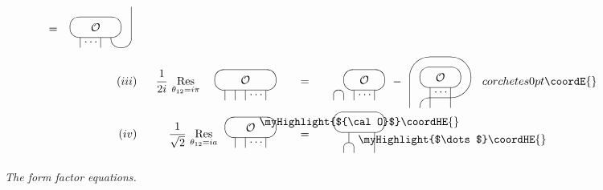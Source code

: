 \documentclass[a4paper,12pt]{article}
\def\limfunc#1{\mathop{\rm #1}}%
\begin{document}
\begin{figure}[tbh]
\[{\begin{array}{rrcl}
~=~ 
\begin{array}{c}
\unitlength3.2mm\begin{picture}(6,4) \put(5,1){\oval(2,2)[b]}
\put(2.5,2){\oval(5,2)} \put(2.5,2){\makebox(0,0){${\cal O}$}}
\put(1,0){\line(0,1){1}} \put(3,0){\line(0,1){1}} \put(6,1){\line(0,1){3}}
\put(1.4,.5){$\dots$} \end{picture}
\end{array}
\\ 
(iii) & ~~\dfrac{1}{2i}\,\limfunc{Res}\limits_{\theta _{12}=i\pi }~~ 
\begin{array}{c}
\unitlength3.2mm\begin{picture}(6,4) \put(3,2){\oval(6,2)}
\put(3,2){\makebox(0,0){${\cal O}$}} \put(1,0){\line(0,1){1}}
\put(2,0){\line(0,1){1}} \put(3,0){\line(0,1){1}} \put(5,0){\line(0,1){1}}
\put(3.4,.5){$\dots$} \end{picture}
\end{array}
~~ & = & ~~ 
\begin{array}{c}
\unitlength3.2mm\begin{picture}(5,4) \put(.5,0){\oval(1,2)[t]}
\put(3,2){\oval(4,2)} \put(3,2){\makebox(0,0){${\cal O}$}}
\put(2,0){\line(0,1){1}} \put(4,0){\line(0,1){1}} \put(2.4,.5){$\dots$}
\end{picture}
\end{array}
- 
\begin{array}{c}
\unitlength3.2mm\begin{picture}(6,5.5) \put(0,0){\line(0,1){3}}
\put(3,3){\oval(6,4)[t]} \put(3,3){\oval(6,4)[br]} \put(3,0){\oval(4,2)[tl]}
\put(3,3){\oval(4,2)} \put(3,3){\makebox(0,0){${\cal O}$}}
\put(2,0){\line(0,1){2}} \put(4,0){\line(0,1){2}} \put(2.4,1.5){$\dots$}
\end{picture}
\end{array}
\\ 
(iv) & \dfrac{1}{\sqrt{2}}\,\limfunc{Res}\limits_{\theta _{12}=ia} 
\begin{array}{c}
\unitlength3.2mm\begin{picture}(5,3) \put(2.5,2){\oval(5,2)}
\put(2.5,2){\makebox(0,0){${\cal O}$}} \put(1,0){\line(0,1){1}}
\put(2,0){\line(0,1){1}} \put(4,0){\line(0,1){1}} \put(2.4,.5){$\dots$}
\end{picture}
\end{array}
~~ & = & ~~ 
\begin{array}{c}
\unitlength3.2mm%
\begin{picture}(5,4) \put(2.5,3){\oval(5,2)} \put(2.5,3){\makebox(0,0){\myHighlight{${\cal O}$}\coordHE{}}}
\put(1.5,0){\oval(1,2)[t]}
\put(1.5,1){\line(0,1){1}} \put(4,0){\line(0,1){2}} \put(2.4,1){\myHighlight{$\dots$}\coordHE{}} \end{picture}
\end{array}
\end{array}
}{corchetes}{0pt}\coordE{}\]
\caption{\textit{The form factor equations. }}
\label{f0}
\end{figure}
\end{document}
